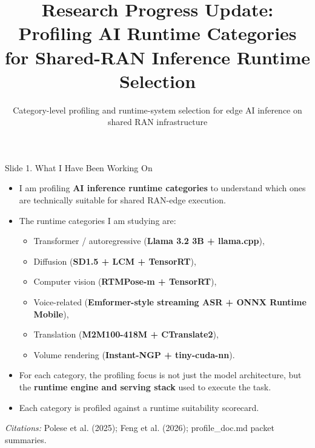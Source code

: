 \documentclass[aspectratio=169]{beamer}
\title[Research Progress Update]{Research Progress Update:\\Profiling AI Runtime Categories for Shared-RAN Inference Runtime Selection}
\subtitle[Runtime-system selection]{Category-level profiling and runtime-system selection for edge AI inference on shared RAN infrastructure}
\author{}
\date{}
\newcommand{\slidecite}[1]{\vspace{0.35em}\par{\tiny\raggedright\textit{Citations: }#1\par}}
\begin{document}
\begin{frame}
  \titlepage
\end{frame}

\begin{frame}[t,shrink=10]{Slide 1. What I Have Been Working On}
\footnotesize
\begin{itemize}
  \item I am profiling \textbf{AI inference runtime categories} to understand which ones are technically suitable for shared RAN-edge execution.
  \item The runtime categories I am studying are:
  \begin{itemize}
    \item Transformer / autoregressive (\textbf{Llama 3.2 3B + llama.cpp}),
    \item Diffusion (\textbf{SD1.5 + LCM + TensorRT}),
    \item Computer vision (\textbf{RTMPose-m + TensorRT}),
    \item Voice-related (\textbf{Emformer-style streaming ASR + ONNX Runtime Mobile}),
    \item Translation (\textbf{M2M100-418M + CTranslate2}),
    \item Volume rendering (\textbf{Instant-NGP + tiny-cuda-nn}).
  \end{itemize}
  \item For each category, the profiling focus is not just the model architecture, but the \textbf{runtime engine and serving stack} used to execute the task.
  \item Each category is profiled against a runtime suitability scorecard.
\end{itemize}
\slidecite{Polese et al. (2025); Feng et al. (2026); profile\_doc.md packet summaries.}
\end{frame}
\end{document}

